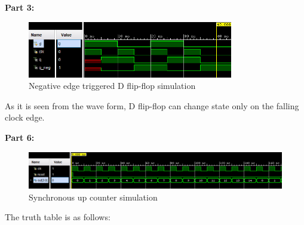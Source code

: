 \documentclass{article}
\begin{document}
	\textbf{Part 3:}
	\begin{figure}[h]
		\centering
		\includegraphics[width=0.8\textwidth]{part3.png}
		\caption{Negative edge triggered D flip-flop simulation}
		\centering
	\end{figure}	
	
	As it is seen from the wave form, D flip-flop can change state only on the falling clock edge.

	\textbf{Part 6:}
	\begin{figure}[h]
		\centering
		\includegraphics[width=1\textwidth]{part6.png}
		\caption{Synchronous up counter simulation}
		\centering
	\end{figure}	
	
	The truth table is as follows:\\
\end{document}
